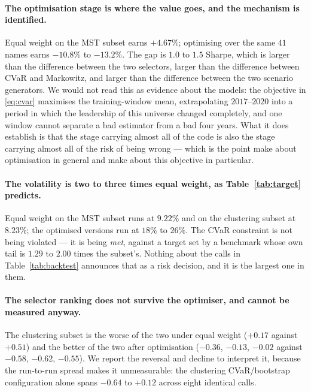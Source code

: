 \documentclass[11pt,a4paper]{article}
\begin{document}
\paragraph{The optimisation stage is where the value goes, and the mechanism is
identified.}
Equal weight on the MST subset earns $+4.67\%$; optimising over the same $41$
names earns $-10.8\%$ to $-13.2\%$. The gap is $1.0$ to $1.5$ Sharpe, which is
larger than the difference between the two selectors, larger than the difference
between CVaR and Markowitz, and larger than the difference between the two
scenario generators. We would not read this as evidence about the models: the
objective in \eqref{eq:cvar} maximises the training-window mean, extrapolating
$2017$--$2020$ into a period in which the leadership of this universe changed
completely, and one window cannot separate a bad estimator from a bad four
years. What it does establish is that the stage carrying almost all of the code
is also the stage carrying almost all of the risk of being wrong --- which is
the point \citet{demiguel2009} make about optimisation in general and
\citet{best1991} make about this objective in particular.

\paragraph{The volatility is two to three times equal weight, as
Table~\ref{tab:target} predicts.}
Equal weight on the MST subset runs at $9.22\%$ and on the clustering subset at
$8.23\%$; the optimised versions run at $18\%$ to $26\%$. The CVaR constraint is
not being violated --- it is being \emph{met}, against a target set by a
benchmark whose own tail is $1.29$ to $2.00$ times the subset's. Nothing about
the calls in Table~\ref{tab:backtest} announces that as a risk decision, and it
is the largest one in them.

\paragraph{The selector ranking does not survive the optimiser, and cannot be
measured anyway.}
The clustering subset is the worse of the two under equal weight
($+0.17$ against $+0.51$) and the better of the two after optimisation
($-0.36$, $-0.13$, $-0.02$ against $-0.58$, $-0.62$, $-0.55$). We report the
reversal and decline to interpret it, because the run-to-run spread makes it
unmeasurable: the clustering CVaR/bootstrap configuration alone spans
$-0.64$ to $+0.12$ across eight identical calls.
\end{document}
